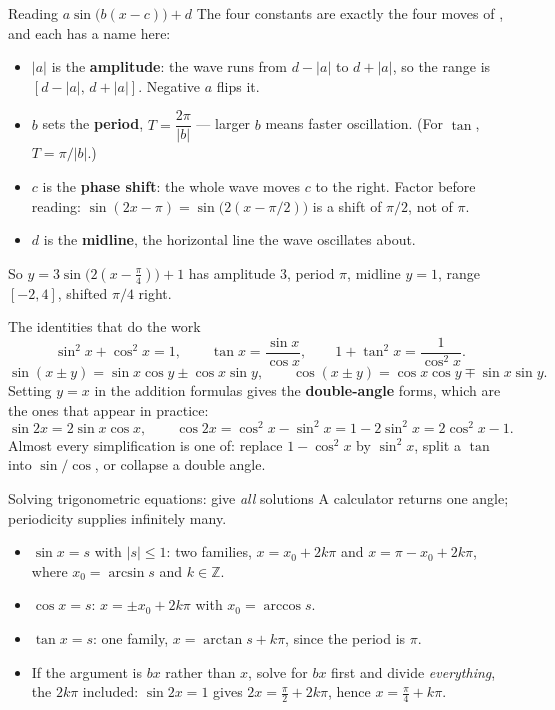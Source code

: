 \begin{rulebox}{Reading $a\sin\bigl(b(x-c)\bigr)+d$}
The four constants are exactly the four moves of , and each has a
name here:
\begin{itemize}[leftmargin=1.6em,itemsep=0.3ex]
  \item $|a|$ is the \textbf{amplitude}: the wave runs from $d-|a|$ to
        $d+|a|$, so the range is $[d-|a|,\,d+|a|]$. Negative $a$ flips it.
  \item $b$ sets the \textbf{period}, $T=\dfrac{2\pi}{|b|}$ --- larger $b$
        means faster oscillation. (For $\tan$, $T=\pi/|b|$.)
  \item $c$ is the \textbf{phase shift}: the whole wave moves $c$ to the
        right. Factor before reading: $\sin(2x-\pi)=\sin\bigl(2(x-\pi/2)\bigr)$
        is a shift of $\pi/2$, not of $\pi$.
  \item $d$ is the \textbf{midline}, the horizontal line the wave
        oscillates about.
\end{itemize}
So $y=3\sin\bigl(2(x-\tfrac{\pi}{4})\bigr)+1$ has amplitude $3$, period
$\pi$, midline $y=1$, range $[-2,4]$, shifted $\pi/4$ right.
\end{rulebox}

\begin{rulebox}{The identities that do the work}
\[
  \sin^{2}x+\cos^{2}x=1,\qquad
  \tan x=\frac{\sin x}{\cos x},\qquad
  1+\tan^{2}x=\frac{1}{\cos^{2}x} .
\]
\[
  \sin(x\pm y)=\sin x\cos y\pm\cos x\sin y,\qquad
  \cos(x\pm y)=\cos x\cos y\mp\sin x\sin y .
\]
Setting $y=x$ in the addition formulas gives the \textbf{double-angle}
forms, which are the ones that appear in practice:
\[
  \sin 2x=2\sin x\cos x,\qquad
  \cos 2x=\cos^{2}x-\sin^{2}x=1-2\sin^{2}x=2\cos^{2}x-1 .
\]
Almost every simplification is one of: replace $1-\cos^{2}x$ by
$\sin^{2}x$, split a $\tan$ into $\sin/\cos$, or collapse a double angle.
\end{rulebox}

\begin{rulebox}{Solving trigonometric equations: give \emph{all} solutions}
A calculator returns one angle; periodicity supplies infinitely many.
\begin{itemize}[leftmargin=1.6em,itemsep=0.35ex]
  \item $\sin x=s$ with $|s|\le1$: two families,
        $x=x_{0}+2k\pi$ and $x=\pi-x_{0}+2k\pi$, where
        $x_{0}=\arcsin s$ and $k\in\mathbb{Z}$.
  \item $\cos x=s$: $x=\pm x_{0}+2k\pi$ with $x_{0}=\arccos s$.
  \item $\tan x=s$: one family, $x=\arctan s+k\pi$, since the period is
        $\pi$.
  \item If the argument is $bx$ rather than $x$, solve for $bx$ first and
        divide \emph{everything}, the $2k\pi$ included: $\sin 2x=1$ gives
        $2x=\tfrac{\pi}{2}+2k\pi$, hence
        $x=\tfrac{\pi}{4}+k\pi$.
\end{itemize}
\end{rulebox}

